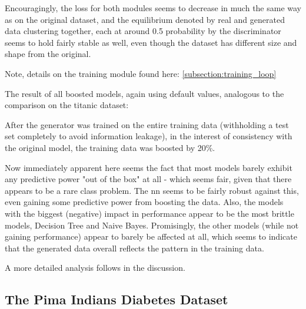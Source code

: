 
\pagebreak

Encouragingly, the loss for both modules seems to decrease in much the same way as on the original dataset, and the equilibrium denoted by real and generated data clustering together, each at around 0.5 probability by the discriminator seems to hold fairly stable as well, even though the dataset has different size and shape from the original.

Note, details on the training module found here: \ref{subsection:training_loop}

The result of all boosted models, again using default values, analogous to the comparison on the titanic dataset:

\pagebreak


\pagebreak

After the generator was trained on the entire training data (withholding a test set completely to avoid information leakage), in the interest of consistency with the original model, the training data was boosted by 20\%.

Now immediately apparent here seems the fact that most models barely exhibit any predictive power "out of the box" at all - which seems fair, given that there appears to be a rare class problem. 
The \ac{nn} seems to be fairly robust against this, even gaining some predictive power from boosting the data. 
Also, the models with the biggest (negative) impact in performance appear to be the most brittle models, Decision Tree and Naive Bayes. 
Promisingly, the other models (while not gaining performance) appear to barely be affected at all, which seems to indicate that the generated data overall reflects the pattern in the training data.

A more detailed analysis follows in the discussion.

\clearpage

\subsection{The Pima Indians Diabetes Dataset}


